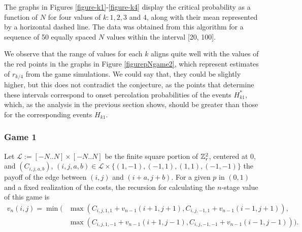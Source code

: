         The graphs in Figures \ref{figure-k1}-\ref{figure-k4} display the critical probability as a function of $N$ for four values of $k\colon 1, 2, 3$ and 4, along with their mean represented by a horizontal dashed line. The data was obtained from this algorithm for a sequence of 50 equally spaced $N$ values within the interval [20, 100].

        We observe that the range of values for each $k$ aligns quite well with the values of the red points in the graphs in Figure \ref{figurepNgame2}, which represent estimates of $r_{k/4}$ from the game simulations. We could say that, they could be slightly higher, but this does not contradict the conjecture, as the points that determine these intervals correspond to onset percolation probabilities of the events $H_{k1}^*$, which, as the analysis in the previous section shows, should be greater than those for the corresponding events $H_{k1}$.

        \subsubsection*{Game 1}
        Let $\mathcal{L} := [-N..N] \times [-N..N]$ be the finite square portion of $\mathbb{Z}_r^2$, centered at $0$, and $(C_{i, j, a, b})$, $(i, j, a, b) \in \mathcal{L} \times \{(1, -1), (-1, 1), (1, 1), (-1, -1)\}$ the payoff of the edge between $(i, j)$ and $(i + a, j + b)$. For a given $p$ in $(0, 1)$ and a fixed realization of the costs, the recursion for calculating the $n$-stage value of this game is
        \begin{align*}   
            v_n(i, j) =  \min (& \max (C_{i, j, 1, 1} + v_{n-1}(i+1, j+1), C_{i, j, -1, 1} + v_{n-1}(i-1, j+1)), \\
                               & \max (C_{i, j, 1, -1} + v_{n-1}(i+1, j-1), C_{i, j, -1, -1} + v_{n-1}(i-1, j-1))).
        \end{align*}


